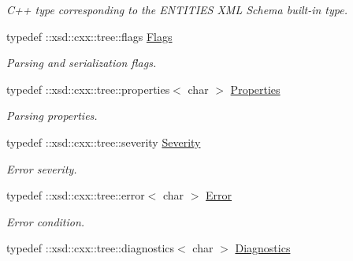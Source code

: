 \begin{DoxyCompactItemize}
\begin{DoxyCompactList}\small\item\em C++ type corresponding to the ENTITIES XML Schema built-\/in type. \item\end{DoxyCompactList}\item 
\hypertarget{namespacexml__schema_affb4c227cbd9aa7453dd1dc5a1401943}{
typedef ::xsd::cxx::tree::flags \hyperlink{namespacexml__schema_affb4c227cbd9aa7453dd1dc5a1401943}{Flags}}
\label{namespacexml__schema_affb4c227cbd9aa7453dd1dc5a1401943}

\begin{DoxyCompactList}\small\item\em Parsing and serialization flags. \item\end{DoxyCompactList}\item 
\hypertarget{namespacexml__schema_ad27ce19a7ee1d3b1064092648898f64c}{
typedef ::xsd::cxx::tree::properties$<$ char $>$ \hyperlink{namespacexml__schema_ad27ce19a7ee1d3b1064092648898f64c}{Properties}}
\label{namespacexml__schema_ad27ce19a7ee1d3b1064092648898f64c}

\begin{DoxyCompactList}\small\item\em Parsing properties. \item\end{DoxyCompactList}\item 
\hypertarget{namespacexml__schema_a1385d97f1fb2a3b623185e7ef2a12c08}{
typedef ::xsd::cxx::tree::severity \hyperlink{namespacexml__schema_a1385d97f1fb2a3b623185e7ef2a12c08}{Severity}}
\label{namespacexml__schema_a1385d97f1fb2a3b623185e7ef2a12c08}

\begin{DoxyCompactList}\small\item\em Error severity. \item\end{DoxyCompactList}\item 
\hypertarget{namespacexml__schema_a21e804b3775e71d965fc63126fa6f4cb}{
typedef ::xsd::cxx::tree::error$<$ char $>$ \hyperlink{namespacexml__schema_a21e804b3775e71d965fc63126fa6f4cb}{Error}}
\label{namespacexml__schema_a21e804b3775e71d965fc63126fa6f4cb}

\begin{DoxyCompactList}\small\item\em Error condition. \item\end{DoxyCompactList}\item 
\hypertarget{namespacexml__schema_aeacc5a291452af2cabc910be1bae640d}{
typedef ::xsd::cxx::tree::diagnostics$<$ char $>$ \hyperlink{namespacexml__schema_aeacc5a291452af2cabc910be1bae640d}{Diagnostics}}
\label{namespacexml__schema_aeacc5a291452af2cabc910be1bae640d}


\end{DoxyCompactItemize}
